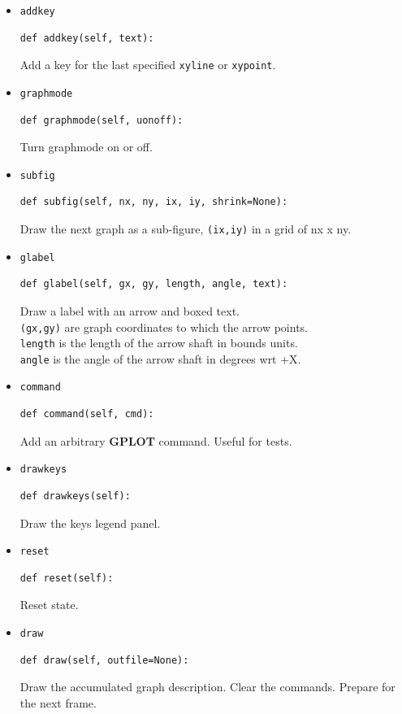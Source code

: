 \documentclass[a4paper,twoside,11pt]{article}
\begin{document}
\begin{itemize}
\item{\texttt{addkey}}\\
\begin{lstlisting}
def addkey(self, text):
\end{lstlisting}
Add a key for the last specified \texttt{xyline} or \texttt{xypoint}.

\item{\texttt{graphmode}}\\
\begin{lstlisting}
def graphmode(self, uonoff):
\end{lstlisting}
Turn graphmode on or off.

\item{\texttt{subfig}}\\
\begin{lstlisting}
def subfig(self, nx, ny, ix, iy, shrink=None):
\end{lstlisting}
Draw the next graph as a sub-figure, \texttt{(ix,iy)} in a grid of nx x ny.

\item{\texttt{glabel}}\\
\begin{lstlisting}
def glabel(self, gx, gy, length, angle, text):
\end{lstlisting}
  Draw a label with an arrow and boxed text.\\
  \texttt{(gx,gy)} are graph coordinates to which the arrow points.\\
  \texttt{length} is the length of the arrow shaft in bounds units.\\
  \texttt{angle} is the angle of the arrow shaft in degrees wrt +X.

\item{\texttt{command}}\\
\begin{lstlisting}
def command(self, cmd):
\end{lstlisting}
Add an arbitrary \textbf{GPLOT} command. Useful for tests.

\item{\texttt{drawkeys}}\\
\begin{lstlisting}
def drawkeys(self):
\end{lstlisting}
Draw the keys legend panel.

\item{\texttt{reset}}\\
\begin{lstlisting}
def reset(self):
\end{lstlisting}
Reset state.

\item{\texttt{draw}}\\
\begin{lstlisting}
def draw(self, outfile=None):
\end{lstlisting}
Draw the accumulated graph description. Clear the commands. Prepare for the next frame.
\end{itemize}
\end{document}

